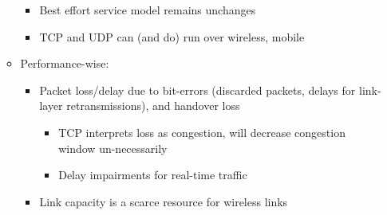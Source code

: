 \begin{itemize}
\begin{itemize}
        \begin{itemize}

          \item Best effort service model remains unchanges

          \item TCP and UDP can (and do) run over wireless, mobile

        \end{itemize}

      \item Performance-wise:

        \begin{itemize}

          \item Packet loss/delay due to bit-errors (discarded packets, delays for link-layer retransmissions), and handover loss

            \begin{itemize}

              \item TCP interprets loss as congestion, will decrease congestion window un-necessarily

              \item Delay impairments for real-time traffic

            \end{itemize}

          \item Link capacity is a scarce resource for wireless links

        \end{itemize}

    \end{itemize}

\end{itemize}



